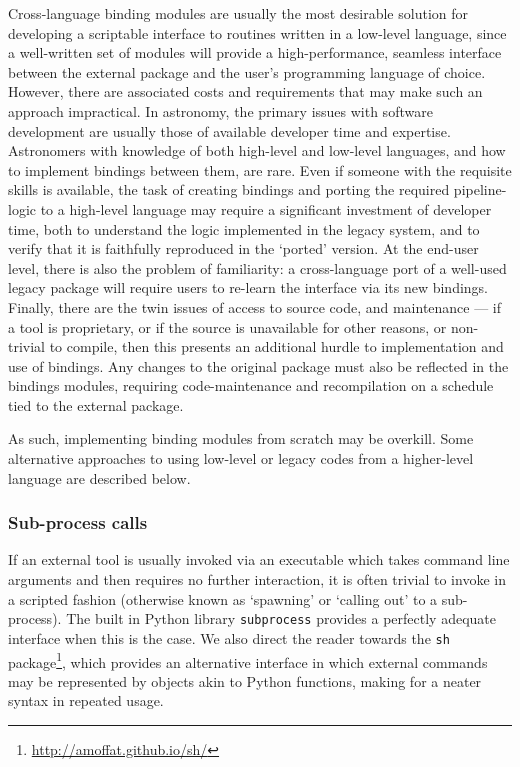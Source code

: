 \documentclass[5p,authoryear]{elsarticle}
\begin{document}
Cross-language binding modules are usually the most desirable solution for developing a scriptable interface to routines written in a low-level language, since a well-written set of modules will provide a high-performance, seamless interface between the external package and the user's programming language of choice.
However, there are associated costs and requirements that may make such an approach impractical. 
In astronomy, the primary issues with software development are usually those of available developer time and expertise.
Astronomers with knowledge of both high-level and low-level languages, and how to implement bindings between them, are rare. 
Even if someone with the requisite skills is available, the task of creating bindings and porting the required pipeline-logic to a high-level language may require a significant investment of developer time, both to understand the logic implemented in the legacy system, and to verify that it is faithfully reproduced in the `ported' version. 
At the end-user level, there is also the problem of familiarity: a cross-language port of a well-used legacy package will require users to re-learn the interface via its new bindings. 
Finally, there are the twin issues of access to source code, and maintenance --- 
if a tool is proprietary, or if the source is unavailable for other reasons, or non-trivial to compile, then this presents an additional hurdle to implementation and use of bindings. 
Any changes to the original package must also be reflected in the bindings modules, requiring code-maintenance and recompilation on a schedule tied to the external package.

As such, implementing binding modules from scratch may be 
overkill.
Some alternative approaches to using low-level or legacy codes from a higher-level language are described below.

\subsubsection{Sub-process calls}
\label{sec:subprocess}
If an external tool is usually invoked via an executable which takes command line arguments and then requires no further interaction, it is often trivial to invoke in a scripted fashion (otherwise known as `spawning' or `calling out' to a sub-process). 
The built in Python library \texttt{subprocess} provides a perfectly adequate interface when this is the case. 
We also direct the reader towards the \texttt{sh} 
package\footnote{
\url{http://amoffat.github.io/sh/}
}, which 
provides an alternative interface in which external commands may be represented by objects akin to Python functions, making for a neater syntax in repeated usage.
\end{document}
